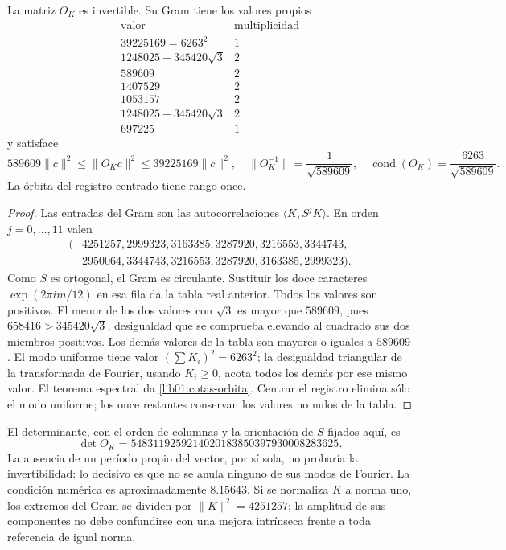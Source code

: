 \begin{theorem}
\label{lib01:marco-ciclico}
La matriz \(O_K\) es invertible. Su Gram tiene los valores propios
\[
\begin{array}{c|c}
 \text{valor}&\text{multiplicidad}\\\hline
 39225169=6263^2&1\\
 1248025-345420\sqrt3&2\\
 589609&2\\
 1407529&2\\
 1053157&2\\
 1248025+345420\sqrt3&2\\
 697225&1
\end{array}
\]
y satisface
\begin{equation}
 589609\|c\|^2\leq\|O_Kc\|^2\leq39225169\|c\|^2,
 \quad
 \|O_K^{-1}\|=\frac1{\sqrt{589609}},\quad
 \operatorname{cond}(O_K)=\frac{6263}{\sqrt{589609}}.
 \label{lib01:cotas-orbita}
\end{equation}
La órbita del registro centrado tiene rango once.
\end{theorem}
\begin{proof}
Las entradas del Gram son las autocorrelaciones
\(\langle K,S^jK\rangle\). En orden \(j=0,\ldots,11\) valen
\begin{align*}
 (&4251257,2999323,3163385,3287920,3216553,3344743,\\
  &2950064,3344743,3216553,3287920,3163385,2999323).
\end{align*}
Como \(S\) es ortogonal, el Gram es circulante. Sustituir los doce
caracteres \(\exp(2\pi i m/12)\) en esa fila da la tabla real
anterior. Todos los valores son positivos. El menor de los dos valores
con \(\sqrt3\) es mayor que \(589609\), pues
\(658416>345420\sqrt3\), desigualdad que se comprueba elevando al
cuadrado sus dos miembros positivos. Los demás valores de la tabla son
mayores o iguales a \(589609\). El modo uniforme tiene valor
\((\sum K_i)^2=6263^2\); la desigualdad triangular de la transformada
de Fourier, usando \(K_i\geq0\), acota todos los demás por ese mismo
valor. El teorema espectral da \eqref{lib01:cotas-orbita}. Centrar
el registro elimina sólo el modo uniforme; los once restantes conservan
los valores no nulos de la tabla.
\end{proof}

El determinante, con el orden de columnas y la orientación de \(S\)
fijados aquí, es
\[
 \det O_K=5483119259214020183850397930008283625.
\]
La ausencia de un período propio del vector, por sí sola, no probaría la
invertibilidad: lo decisivo es que no se anula ninguno de sus modos de
Fourier. La condición numérica es aproximadamente \(8.15643\). Si se
normaliza \(K\) a norma uno, los extremos del Gram se dividen por
\(\|K\|^2=4251257\); la amplitud de sus componentes no debe
confundirse con una mejora intrínseca frente a toda referencia de igual
norma.

